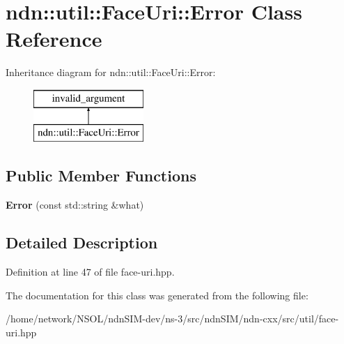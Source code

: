 \hypertarget{classndn_1_1util_1_1FaceUri_1_1Error}{}\section{ndn\+:\+:util\+:\+:Face\+Uri\+:\+:Error Class Reference}
\label{classndn_1_1util_1_1FaceUri_1_1Error}
Inheritance diagram for ndn\+:\+:util\+:\+:Face\+Uri\+:\+:Error\+:\begin{figure}[H]
\begin{center}
\leavevmode
\includegraphics[height=2.000000cm]{classndn_1_1util_1_1FaceUri_1_1Error}
\end{center}
\end{figure}
\subsection*{Public Member Functions}
\begin{DoxyCompactItemize}
\item 
{\bfseries Error} (const std\+::string \&what)\hypertarget{classndn_1_1util_1_1FaceUri_1_1Error_aea9a9ac4149d8371c6118aa306db0466}{}\label{classndn_1_1util_1_1FaceUri_1_1Error_aea9a9ac4149d8371c6118aa306db0466}

\end{DoxyCompactItemize}


\subsection{Detailed Description}


Definition at line 47 of file face-\/uri.\+hpp.



The documentation for this class was generated from the following file\+:\begin{DoxyCompactItemize}
\item 
/home/network/\+N\+S\+O\+L/ndn\+S\+I\+M-\/dev/ns-\/3/src/ndn\+S\+I\+M/ndn-\/cxx/src/util/face-\/uri.\+hpp\end{DoxyCompactItemize}
